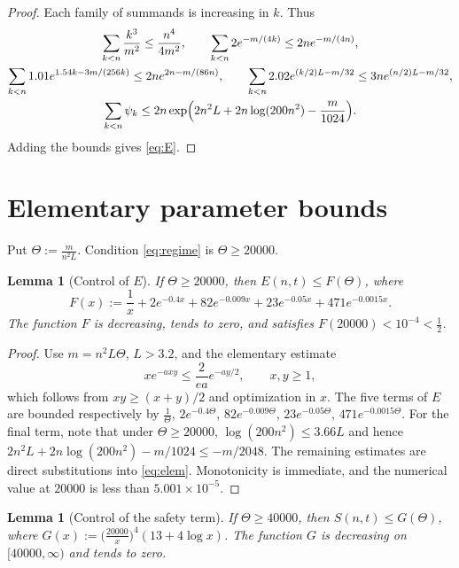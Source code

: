 \documentclass[11pt,reqno]{amsart}
\theoremstyle{plain}
\newtheorem{lemma}[theorem]{Lemma}
\theoremstyle{definition}
\theoremstyle{remark}
\begin{document}
\begin{proof}
Each family of summands is increasing in \(k\). Thus
\begin{gather*}
  \sum_{k<n}\frac{k^3}{m^2}\le\frac{n^4}{4m^2},\qquad
  \sum_{k<n}2e^{-m/(4k)}\le2ne^{-m/(4n)},\\
  \sum_{k<n}1.01e^{1.54k-3m/(256k)}\le2ne^{2n-m/(86n)},\qquad
  \sum_{k<n}2.02e^{(k/2)L-m/32}\le3ne^{(n/2)L-m/32},\\
  \sum_{k<n}\psi_k\le2n\exp\Bigl(2n^2L+2n\log(200n^2)-\frac m{1024}\Bigr).
\end{gather*}
Adding the bounds gives \eqref{eq:E}.
\end{proof}

\section{Elementary parameter bounds}

Put \(\Theta:=\tfrac m{n^2L}\). Condition \eqref{eq:regime} is
\(\Theta\ge20000\).

\begin{lemma}[Control of \(E\)]\label{lem:controlE}
If \(\Theta\ge20000\), then \(E(n,t)\le F(\Theta)\), where
\[
  F(x):=\frac1x+2e^{-0.4x}+82e^{-0.009x}+23e^{-0.05x}+471e^{-0.0015x}.
\]
The function \(F\) is decreasing, tends to zero, and satisfies
\(F(20000)<10^{-4}<\tfrac12\).
\end{lemma}

\begin{proof}
Use \(m=n^2L\Theta\), \(L>3.2\), and the elementary estimate
\begin{equation}\label{eq:elem}
  xe^{-axy}\le\frac2{ea}e^{-ay/2},\qquad x,y\ge1,
\end{equation}
which follows from \(xy\ge(x+y)/2\) and optimization in \(x\). The five terms
of \(E\) are bounded respectively by
\(\tfrac1\Theta\), \(2e^{-0.4\Theta}\), \(82e^{-0.009\Theta}\),
\(23e^{-0.05\Theta}\), \(471e^{-0.0015\Theta}\). For the final term, note that
under \(\Theta\ge20000\), \(\log(200n^2)\le3.66L\) and hence
\(2n^2L+2n\log(200n^2)-m/1024\le-m/2048\). The remaining estimates are direct
substitutions into \eqref{eq:elem}. Monotonicity is immediate, and the
numerical value at \(20000\) is less than \(5.001\times10^{-5}\).
\end{proof}

\begin{lemma}[Control of the safety term]\label{lem:controlS}
If \(\Theta\ge40000\), then \(S(n,t)\le G(\Theta)\), where
\(G(x):=\bigl(\tfrac{20000}x\bigr)^4(13+4\log x)\). The function \(G\) is
decreasing on \([40000,\infty)\) and tends to zero.
\end{lemma}
\end{document}
